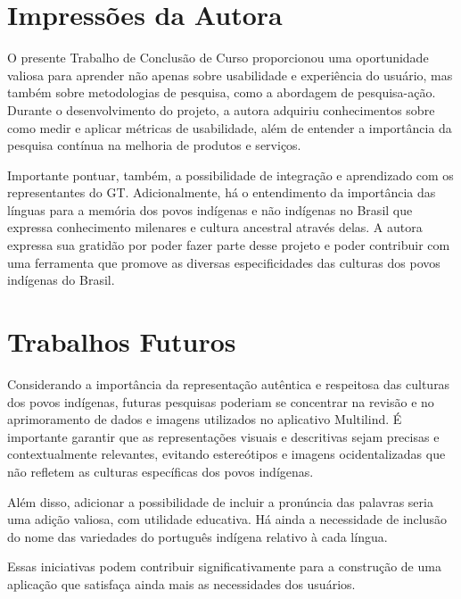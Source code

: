 \section{Impressões da Autora}
\label{sec:Impressões da Autora}
O presente Trabalho de Conclusão de Curso proporcionou uma oportunidade valiosa para aprender não apenas sobre usabilidade e experiência do usuário, mas também sobre metodologias de pesquisa, como a abordagem de pesquisa-ação. 
Durante o desenvolvimento do projeto, a autora adquiriu conhecimentos sobre como medir e aplicar métricas de usabilidade, além de entender a importância da pesquisa contínua na melhoria de produtos e serviços. 

Importante pontuar, também, a possibilidade de integração e aprendizado com os representantes do GT. Adicionalmente, há o entendimento da importância das línguas para a memória dos povos indígenas e não indígenas no Brasil que expressa 
conhecimento milenares e cultura ancestral através delas. A autora expressa sua gratidão por poder fazer parte desse projeto e poder contribuir com uma ferramenta que promove as diversas especificidades das culturas dos 
povos indígenas do Brasil. 

\section{Trabalhos Futuros}
\label{sec:Trabalhos Futuros}
Considerando a importância da representação autêntica e respeitosa das culturas dos povos indígenas, futuras pesquisas poderiam se concentrar na revisão e no aprimoramento de dados e imagens utilizados no aplicativo Multilind. É 
importante garantir que as representações visuais e descritivas sejam precisas e contextualmente relevantes, evitando estereótipos e imagens ocidentalizadas que não refletem as culturas específicas dos povos indígenas. 

Além disso, adicionar a possibilidade de incluir a pronúncia das palavras seria uma adição valiosa, com utilidade educativa. Há ainda a necessidade de inclusão do nome das variedades do português indígena relativo à cada língua.

Essas iniciativas podem contribuir significativamente para a construção de uma aplicação que satisfaça ainda mais as necessidades dos usuários.

